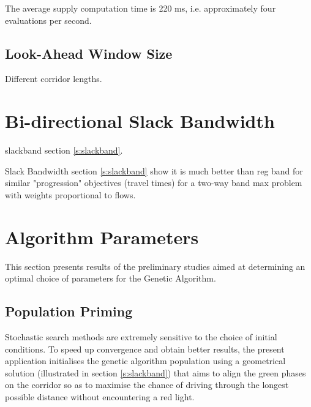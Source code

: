 The average supply computation time is 220 ms, i.e. approximately four evaluations per second.


\subsection{Look-Ahead Window Size} \label{res:windowsizing}

Different corridor lengths.




\section{Bi-directional Slack Bandwidth}
slackband section \ref{s:slackband}.



Slack Bandwidth section \ref{s:slackband} show it is much better than reg band for similar "progression" objectives (travel times) for a two-way band max problem with weights proportional to flows. 

\section{Algorithm Parameters}
This section presents results of the preliminary studies aimed at determining an optimal choice of parameters for the Genetic Algorithm.

\subsection{Population Priming} \label{s:poppriming}
Stochastic search methods are extremely sensitive to the choice of initial conditions. To speed up convergence and obtain better results, the present application initialises the genetic algorithm population using a geometrical solution (illustrated in section \ref{s:slackband}) that aims to align the green phases on the corridor so as to maximise the chance of driving through the longest possible distance without encountering a red light.

